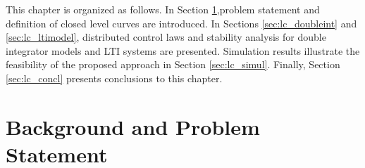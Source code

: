 This chapter is organized as follows. In Section \ref{sec:lc_background},problem statement and definition of closed level curves are introduced. In Sections \ref{sec:lc_doubleint}  and \ref{sec:lc_ltimodel}, distributed control laws and stability analysis for double integrator models and LTI systems are presented. Simulation results illustrate the feasibility of the proposed approach in Section \ref{sec:lc_simul}. Finally, Section \ref{sec:lc_concl} presents conclusions to this chapter.





\section{Background and Problem Statement} \label{sec:lc_background}


